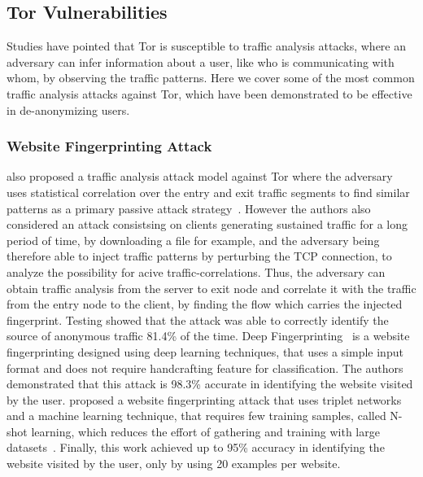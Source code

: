 \subsection{Tor Vulnerabilities}\label{subsec:tor_vulnerabilities}

Studies have pointed that Tor is susceptible to traffic analysis attacks, where an adversary can infer information about a user, like who is communicating with whom, by observing the traffic patterns. Here we cover some of the most common traffic analysis attacks against Tor, which have been demonstrated to be effective in de-anonymizing users.

\subsubsection{Website Fingerprinting Attack}\label{subsubsec:website_fingerprinting_attack}

\citeauthor{chakravarty2014trafficanalysis} also proposed a traffic analysis attack model against Tor where the adversary uses statistical correlation over the entry and exit traffic segments to find similar patterns as a primary passive attack strategy~\cite{chakravarty2014trafficanalysis}. However the authors also considered an attack consistsing on clients generating sustained traffic for a long period of time, by downloading a file for example, and the adversary being therefore able to inject traffic patterns by perturbing the TCP connection, to analyze the possibility for acive traffic-correlations.
Thus, the adversary can obtain traffic analysis from the server to exit node and correlate it with the traffic from the entry node to the client, by finding the flow which carries the injected fingerprint.
Testing showed that the attack was able to correctly identify the source of anonymous traffic 81.4\% of the time.
Deep Fingerprinting~\cite{DeepFingerprinting} is a website fingerprinting designed using deep learning techniques, that uses a simple input format and does not require handcrafting feature for classification. The authors demonstrated that this attack is 98.3\% accurate in identifying the website visited by the user.
\citeauthor{TripletFingerprinting} proposed a website fingerprinting attack that uses triplet networks and a machine learning technique, that requires few training samples, called N-shot learning, which reduces the effort of gathering and training with large datasets~\cite{TripletFingerprinting}. Finally, this work achieved up to 95\% accuracy in identifying the website visited by the user, only by using 20 examples per website.

